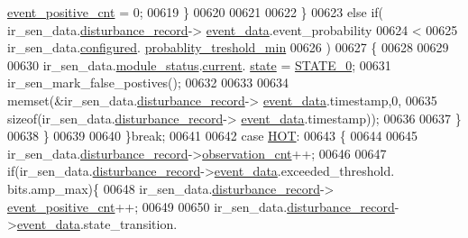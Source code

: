 \begin{DoxyCode}
      \hyperlink{a00028_a7397b9d76d4b57500f27bb23d258a18a}{event\_positive\_cnt} = 0;
00619                            \}
00620 
00621 
00622                    \}
00623                    \textcolor{keywordflow}{else} \textcolor{keywordflow}{if}( ir\_sen\_data.\hyperlink{a00023_ac9b38e2c1d3f1013a88d33506c754152}{disturbance\_record}->
      \hyperlink{a00028_a8c0bda69e71ef674e60da47ad0be9ab0}{event\_data}.event\_probability
00624                             <
00625                            ir\_sen\_data.\hyperlink{a00023_a94b2d1f6ea4ab334c74d24984dd27843}{configured}.
      \hyperlink{a00021_aa59261f74183d4f9e909ac425e0bea35}{probablity\_treshold\_min}
00626                            )
00627                          \{
00628 
00629 
00630                              ir\_sen\_data.\hyperlink{a00023_a5a53c391562b059eb744ac679f3765ca}{module\_status}.\hyperlink{a00017_ab8af48cdbba92b3ae39c4470e53af944}{current}.
      \hyperlink{a00017_a6b8d8e916bc56265a3fd279bd26b6d1b}{state} = \hyperlink{a00021_ad6739dbbe5581cac99b7dc8a5e09949c}{STATE\_0};
00631                              ir\_sen\_mark\_false\_postives();
00632 
00633 
00634                              memset(&ir\_sen\_data.\hyperlink{a00023_ac9b38e2c1d3f1013a88d33506c754152}{disturbance\_record}->
      \hyperlink{a00028_a8c0bda69e71ef674e60da47ad0be9ab0}{event\_data}.timestamp,0,
00635                                      \textcolor{keyword}{sizeof}(ir\_sen\_data.\hyperlink{a00023_ac9b38e2c1d3f1013a88d33506c754152}{disturbance\_record}->
      \hyperlink{a00028_a8c0bda69e71ef674e60da47ad0be9ab0}{event\_data}.timestamp));
00636 
00637                         \}
00638              \}
00639 
00640         \}\textcolor{keywordflow}{break};
00641 
00642         \textcolor{keywordflow}{case} \hyperlink{a00021_a1eb14cc432874ddacd1934791dbe12a3}{HOT}:
00643         \{
00644 
00645              ir\_sen\_data.\hyperlink{a00023_ac9b38e2c1d3f1013a88d33506c754152}{disturbance\_record}->\hyperlink{a00028_ad5b0bac02ce266b91b2b52a1c3ea1d78}{observation\_cnt}++;
00646 
00647             \textcolor{keywordflow}{if}(ir\_sen\_data.\hyperlink{a00023_ac9b38e2c1d3f1013a88d33506c754152}{disturbance\_record}->\hyperlink{a00028_a8c0bda69e71ef674e60da47ad0be9ab0}{event\_data}.exceeded\_threshold.
      bits.amp\_max)\{
00648                  ir\_sen\_data.\hyperlink{a00023_ac9b38e2c1d3f1013a88d33506c754152}{disturbance\_record}->
      \hyperlink{a00028_a7397b9d76d4b57500f27bb23d258a18a}{event\_positive\_cnt}++;
00649 
00650                 ir\_sen\_data.\hyperlink{a00023_ac9b38e2c1d3f1013a88d33506c754152}{disturbance\_record}->\hyperlink{a00028_a8c0bda69e71ef674e60da47ad0be9ab0}{event\_data}.state\_transition.

\end{DoxyCode}
